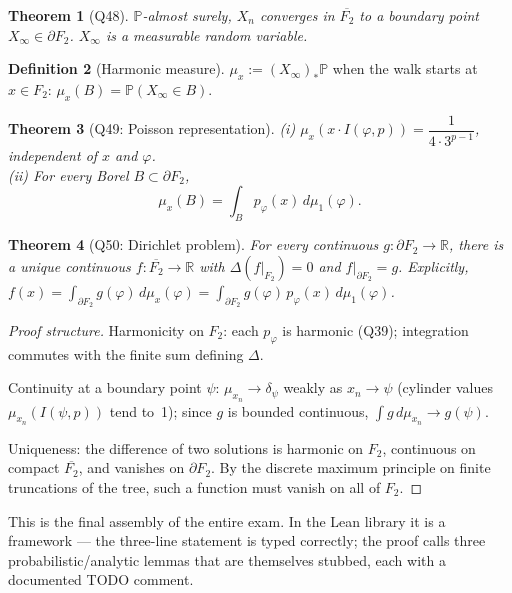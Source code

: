 \documentclass[11pt,a4paper]{article}
\newcommand{\R}{\mathbb{R}}
\newcommand{\BFG}{\partial F_2}
\newcommand{\cpt}{\overline{F_2}}
\newcommand{\poiss}{p}
\theoremstyle{plain}
\newtheorem{theorem}{Theorem}[section]
\theoremstyle{definition}
\newtheorem{definition}[theorem]{Definition}
\begin{document}
\begin{theorem}[Q48]
$\mathbb P$-almost surely, $X_n$ converges in $\cpt$ to a boundary
point $X_\infty \in \BFG$. $X_\infty$ is a measurable random variable.
\end{theorem}

\begin{definition}[Harmonic measure]
$\mu_x := (X_\infty)_*\mathbb P$ when the walk starts at $x \in F_2$:
$\mu_x(B) = \mathbb P(X_\infty \in B)$.
\end{definition}

\begin{theorem}[Q49: Poisson representation]
(i) $\mu_x(x \cdot I(\varphi, p)) = \dfrac{1}{4 \cdot 3^{p-1}}$,
independent of $x$ and $\varphi$.\\
(ii) For every Borel $B \subset \BFG$,
\[ \mu_x(B) = \int_B \poiss_\varphi(x) \, d\mu_1(\varphi). \]
\end{theorem}

\begin{theorem}[Q50: Dirichlet problem]
For every continuous $g : \BFG \to \R$, there is a unique continuous
$f : \cpt \to \R$ with $\Delta(f|_{F_2}) = 0$ and $f|_{\BFG} = g$.
Explicitly,
$f(x) = \int_{\BFG} g(\varphi)\, d\mu_x(\varphi)
     = \int_{\BFG} g(\varphi)\, \poiss_\varphi(x)\, d\mu_1(\varphi)$.
\end{theorem}

\begin{proof}[Proof structure]
Harmonicity on $F_2$: each $\poiss_\varphi$ is harmonic (Q39); integration
commutes with the finite sum defining $\Delta$.

Continuity at a boundary point $\psi$: $\mu_{x_n} \to \delta_\psi$ weakly
as $x_n \to \psi$ (cylinder values $\mu_{x_n}(I(\psi, p))$ tend to~1);
since $g$ is bounded continuous, $\int g\,d\mu_{x_n} \to g(\psi)$.

Uniqueness: the difference of two solutions is harmonic on $F_2$,
continuous on compact $\cpt$, and vanishes on $\BFG$. By the discrete
maximum principle on finite truncations of the tree, such a function
must vanish on all of $F_2$.
\end{proof}

This is the final assembly of the entire exam. In the Lean library it
is a framework --- the three-line statement is typed correctly; the
proof calls three probabilistic/analytic lemmas that are themselves
stubbed, each with a documented TODO comment.

\end{document}
